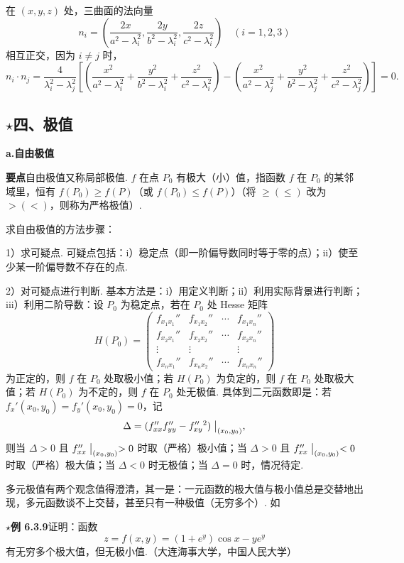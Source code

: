 \documentclass[UTF8, 12pt, fontset=fandol, oneside]{ctexart}
\begin{document}
在 $(x,y,z)$ 处，三曲面的法向量
\[
  n_i=\left(\frac{2x}{a^2-\lambda_i^2},
  \frac{2y}{b^2-\lambda_i^2},
  \frac{2z}{c^2-\lambda_i^2}\right)\quad(i=1,2,3)
\]
相互正交，因为 $i\ne j$ 时，
\[
  n_i\cdot n_j=
  \frac4{\lambda_i^2-\lambda_j^2}
  \left[
  \left(\frac{x^2}{a^2-\lambda_i^2}
  +\frac{y^2}{b^2-\lambda_i^2}
  +\frac{z^2}{c^2-\lambda_i^2}\right)
  -\left(\frac{x^2}{a^2-\lambda_j^2}
  +\frac{y^2}{b^2-\lambda_j^2}
  +\frac{z^2}{c^2-\lambda_j^2}\right)\right]=0.
\]

\subsection*{\ensuremath{\star}四、极值}

\noindent\textbf{a.\quad 自由极值}

\noindent\textbf{要点}\quad 自由极值又称局部极值. $f$ 在点 $P_0$ 有极大（小）值，指函数 $f$ 在 $P_0$ 的某邻域里，恒有 $f(P_0)\ge f(P)$（或 $f(P_0)\le f(P)$）（将 $\ge(\le)$ 改为 $>(<)$，则称为严格极值）.

求自由极值的方法步骤：

1）求可疑点. 可疑点包括：i）稳定点（即一阶偏导数同时等于零的点）；ii）使至少某一阶偏导数不存在的点.

2）对可疑点进行判断. 基本方法是：i）用定义判断；ii）利用实际背景进行判断；iii）利用二阶导数：设 $P_0$ 为稳定点，若在 $P_0$ 处 Hesse 矩阵
\[
  H(P_0)=
  \begin{pmatrix}
  f_{x_1x_1}''&f_{x_1x_2}''&\cdots&f_{x_1x_n}''\\
  f_{x_2x_1}''&f_{x_2x_2}''&\cdots&f_{x_2x_n}''\\
  \vdots&\vdots&&\vdots\\
  f_{x_nx_1}''&f_{x_nx_2}''&\cdots&f_{x_nx_n}''
  \end{pmatrix}
\]
为正定的，则 $f$ 在 $P_0$ 处取极小值；若 $H(P_0)$ 为负定的，则 $f$ 在 $P_0$ 处取极大值；若 $H(P_0)$ 为不定的，则 $f$ 在 $P_0$ 处无极值. 具体到二元函数即是：若 $f_x'(x_0,y_0)=f_y'(x_0,y_0)=0$，记
\[
  \Delta=(f_{xx}''f_{yy}''-f_{xy}''{}^2)\bigm|_{(x_0,y_0)},
\]
则当 $\Delta>0$ 且 $f_{xx}''\bigm|_{(x_0,y_0)}>0$ 时取（严格）极小值；当 $\Delta>0$ 且 $f_{xx}''\bigm|_{(x_0,y_0)}<0$ 时取（严格）极大值；当 $\Delta<0$ 时无极值；当 $\Delta=0$ 时，情况待定.

多元极值有两个观念值得澄清，其一是：一元函数的极大值与极小值总是交替地出现，多元函数谈不上交替，甚至只有一种极值（无穷多个）. 如

\noindent\textbf{\ensuremath{\star}例 6.3.9}\quad 证明：函数
\[
  z=f(x,y)=(1+e^y)\cos x-ye^y
\]
有无穷多个极大值，但无极小值.（大连海事大学，中国人民大学）
\end{document}
